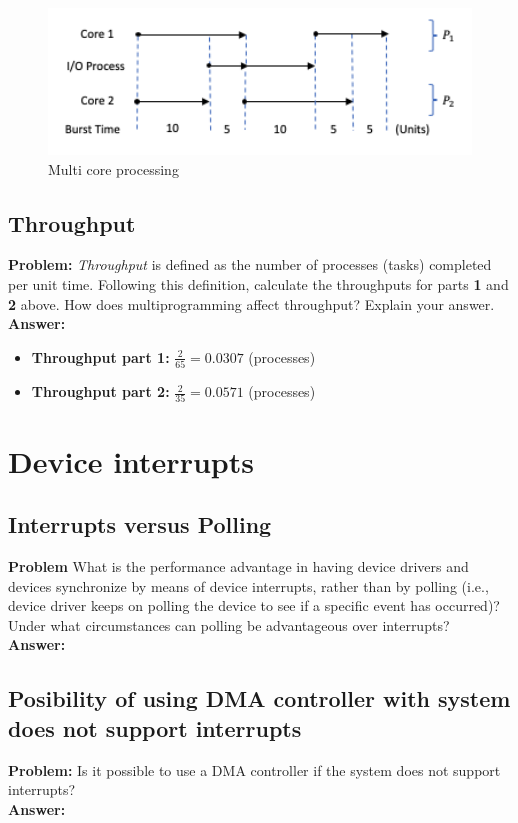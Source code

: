 \documentclass[a4paper]{article}
\begin{document}
\begin{figure}[ht]
    \centering
    \includegraphics[width=150mm,scale=0.8]{multicoreProcess}
    \caption{Multi core processing}
\end{figure}

\subsection{Throughput}
\textbf{Problem:}
\textit{Throughput} is defined as the number of processes (tasks) completed per unit time.
Following this definition, calculate the throughputs for parts \textbf{1} and \textbf{2} above. How does multiprogramming affect throughput? Explain your answer.
\\
\textbf{Answer:}
\begin{itemize}
    \item\textbf{Throughput part 1:} $\frac{2}{65} = 0.0307$ (processes)
    \item\textbf{Throughput part 2:} $\frac{2}{35} = 0.0571$ (processes)
\end{itemize}


\newpage
\section{Device interrupts}
\subsection{Interrupts versus Polling}
\textbf{Problem}
What is the performance advantage in having device drivers and devices synchronize by means of device interrupts, rather than by polling (i.e., device driver keeps on polling the device to see if a specific event has occurred)?
Under what circumstances can polling be advantageous over interrupts?
\\
\textbf{Answer:}

\subsection{Posibility of using DMA controller with system does not support interrupts}
\textbf{Problem:}
Is it possible to use a DMA controller if the system does not support interrupts?
\\
\textbf{Answer:}
\end{document}
